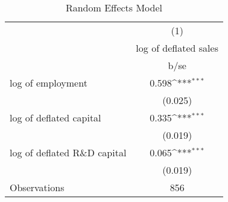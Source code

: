 \begin{table}[htbp]\centering
\def\sym#1{\ifmmode^{#1}\else\(^{#1}\)\fi}
\caption{Random Effects Model}
\begin{tabular}{l*{1}{c}}
\toprule
                    &\multicolumn{1}{c}{(1)}\\
                    &\multicolumn{1}{c}{log of deflated sales}\\
                    &        b/se         \\
\midrule
log of employment   &       0.598\sym{***}\\
                    &     (0.025)         \\
log of deflated capital&       0.335\sym{***}\\
                    &     (0.019)         \\
log of deflated R\&D capital&       0.065\sym{***}\\
                    &     (0.019)         \\
\midrule
Observations        &         856         \\
\bottomrule
\end{tabular}
\end{table}
